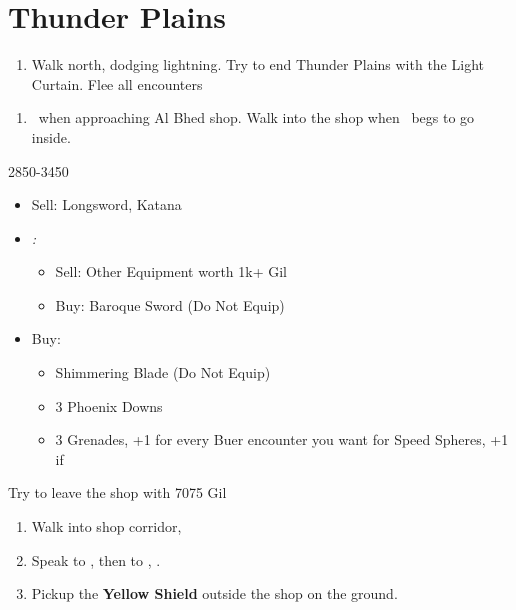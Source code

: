 \chapter{Thunder Plains}

\begin{enumerate}
	\item Walk north, dodging lightning. Try to end Thunder Plains with the Light Curtain. Flee all encounters
\end{enumerate}
\begin{enumerate}[resume]
	\item \sd\ when approaching Al Bhed shop. Walk into the shop when \rikku\ begs to go inside.
\end{enumerate}
\begin{shop}{2850-3450}
	\begin{itemize}
		\item Sell: Longsword, Katana
		\item \textit{\blitzloss:}
		      \begin{itemize}
			      \item Sell: Other Equipment worth 1k+ Gil
			      \item Buy: Baroque Sword (Do Not Equip)
		      \end{itemize}
		\item Buy:
		      \begin{itemize}
			      \item Shimmering Blade (Do Not Equip)
			      \item 3 Phoenix Downs
			      \item 3 Grenades, +1 for every Buer encounter you want for Speed Spheres, +1 if \blitzloss
		      \end{itemize}
	\end{itemize}
	Try to leave the shop with 7075 Gil
\end{shop}
\begin{enumerate}[resume]
	\item Walk into shop corridor, \cs[2:00]
	\item Speak to \auron, then to \rikku, \sd.
	\item Pickup the \textbf{Yellow Shield} outside the shop on the ground.
\end{enumerate}

